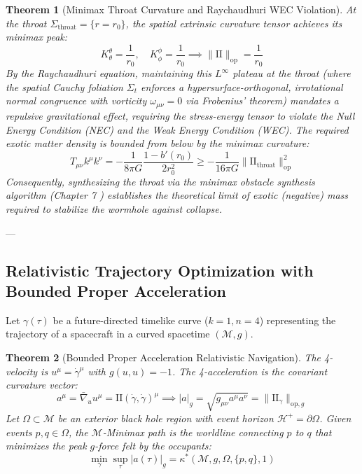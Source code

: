 \documentclass[11pt,reqno]{amsart}
\newtheorem{theorem}{Theorem}[section]
\theoremstyle{definition}
\providecommand{\II}{\mathrm{I\!I}}
\newcommand{\op}{\mathrm{op}}
\numberwithin{equation}{section}
\providecommand{\II}{\mathrm{II}}
\begin{document}
\begin{theorem}[Minimax Throat Curvature and Raychaudhuri WEC Violation]
At the throat $\Sigma_{\text{throat}} = \{r = r_0\}$, the spatial extrinsic curvature tensor achieves its minimax peak:
\begin{equation}
K^\theta_\theta = \frac{1}{r_0}, \quad K^\phi_\phi = \frac{1}{r_0} \implies \|\II\|_{\op} = \frac{1}{r_0}
\end{equation}
By the Raychaudhuri equation, maintaining this $L^\infty$ plateau at the throat (where the spatial Cauchy foliation $\Sigma_t$ enforces a hypersurface-orthogonal, irrotational normal congruence with vorticity $\omega_{\mu\nu} = 0$ via Frobenius' theorem) mandates a repulsive gravitational effect, requiring the stress-energy tensor to violate the Null Energy Condition (NEC) and the Weak Energy Condition (WEC). The required exotic matter density is bounded from below by the minimax curvature:
\begin{equation}
T_{\mu\nu} k^\mu k^\nu = -\frac{1}{8\pi G} \frac{1 - b'(r_0)}{2 r_0^2} \ge -\frac{1}{16\pi G} \|\II_{\text{throat}}\|_{\op}^2
\end{equation}
Consequently, synthesizing the throat via the minimax obstacle synthesis algorithm (Chapter 7 \cite{silvafilho2026minimax}) establishes the theoretical limit of exotic (negative) mass required to stabilize the wormhole against collapse.
\end{theorem}

---

\subsection{Relativistic Trajectory Optimization with Bounded Proper Acceleration}
Let $\gamma(\tau)$ be a future-directed timelike curve ($k=1, n=4$) representing the trajectory of a spacecraft in a curved spacetime $(\mathcal{M}, g)$.

\begin{theorem}[Bounded Proper Acceleration Relativistic Navigation]
The 4-velocity is $u^\mu = \dot{\gamma}^\mu$ with $g(u, u) = -1$. The 4-acceleration is the covariant curvature vector:
\begin{equation}
a^\mu = \bar{\nabla}_u u^\mu = \II(\dot{\gamma}, \dot{\gamma})^\mu \implies |a|_g = \sqrt{g_{\mu\nu} a^\mu a^\nu} = \|\II_\gamma\|_{\op, g}
\end{equation}
Let $\Omega \subset \mathcal{M}$ be an exterior black hole region with event horizon $\mathcal{H}^+ = \partial\Omega$. Given events $p, q \in \Omega$, the $\mathcal{M}$-Minimax path is the worldline connecting $p$ to $q$ that minimizes the peak $g$-force felt by the occupants:
\begin{equation}
\min_{\gamma} \sup_{\tau} |a(\tau)|_g = \kappa^*(\mathcal{M}, g, \Omega, \{p,q\}, 1)
\end{equation}
\end{theorem}
\end{document}
